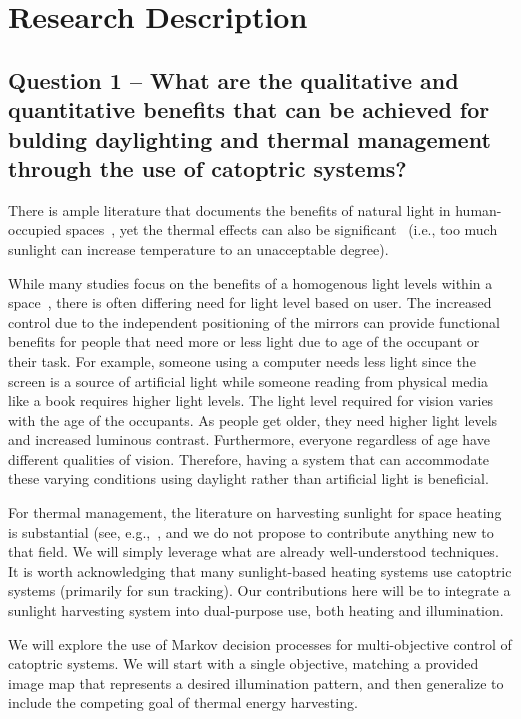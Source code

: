 \section{Research Description}
\label{sec:research}

\subsection{Question 1 -- What are the qualitative and quantitative benefits
that can be achieved for bulding daylighting and thermal management
through the use of catoptric systems?}

There is ample literature that documents the benefits of natural light in
human-occupied spaces~\cite{Leslie03,ll01,pce00}, yet the thermal effects
can also be significant~\cite{bmbc13} (i.e., too much sunlight can
increase temperature to an unacceptable degree).

While many studies focus on the benefits of a homogenous light levels
within a space~\cite{azaise13,bwkk15},
there is often differing need for light level based on user.
The increased control due to the independent positioning of the mirrors
can provide functional benefits for people that need more or less
light due to age of the occupant or their task. For example, someone using
a computer needs less light since the screen is a source of
artificial light while someone reading from physical media like
a book requires higher light levels. The light level required for
vision varies with the age of the occupants. As people get older,
they need higher light levels and increased luminous contrast.
Furthermore, everyone regardless of age have different qualities
of vision. Therefore, having a system that can accommodate these
varying conditions using daylight rather than artificial light is beneficial.

For thermal management, the literature on harvesting sunlight for space
heating is substantial (see, e.g.,~\cite{deW75,Hunt79,kbd76,Lunde80,smf08,wo06},
and we do not propose to contribute anything
new to that field.  We will simply leverage what are already well-understood
techniques. It is worth acknowledging that many sunlight-based heating systems
use catoptric systems (primarily for sun tracking). Our contributions here
will be to integrate a sunlight harvesting system into dual-purpose use, both
heating and illumination.

We will explore the use of Markov decision processes for multi-objective
control of catoptric systems.  We will start with a single objective,
matching a provided image map that represents a desired illumination pattern,
and then generalize to include the competing goal of thermal energy
harvesting.

